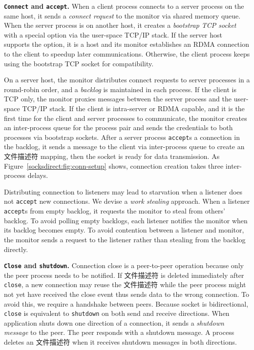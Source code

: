 \textbf{\texttt{Connect} and \texttt{accept}.}
When a client process connects to a server process on the same host, it sends a \textit{connect request} to the monitor via shared memory queue. When the server process is on another host, it creates a \textit{bootstrap TCP socket} with a special option via the user-space TCP/IP stack. If the server host supports the option, it is a \sys host and its monitor establishes an RDMA connection to the client to speedup later communications. Otherwise, the client process keeps using the bootstrap TCP socket for compatibility.

On a server host, the monitor distributes connect requests to server processes in a round-robin order, and a \textit{backlog} is maintained in each process. If the client is TCP only, the monitor proxies messages between the server process and the user-space TCP/IP stack. If the client is intra-server or RDMA capable, and it is the first time for the client and server processes to communicate, the monitor creates an inter-process queue for the process pair and sends the credentials to both processes via bootstrap sockets. After a server process \texttt{accept}s a connection in the backlog, it sends a message to the client via inter-process queue to create an 文件描述符 mapping, then the socket is ready for data transmission. As Figure~\ref{socksdirect:fig:conn-setup} shows, connection creation takes three inter-process delays.

Distributing connection to listeners may lead to starvation when a listener does not \texttt{accept} new connections. We devise a \textit{work stealing} approach. When a listener \texttt{accept}s from empty backlog, it requests the monitor to steal from others' backlog. To avoid polling empty backlogs, each listener notifies the monitor when its backlog becomes empty. To avoid contention between a listener and monitor, the monitor sends a request to the listener rather than stealing from the backlog directly.


\textbf{\texttt{Close} and \texttt{shutdown}.}
Connection close is a peer-to-peer operation because only the peer process needs to be notified. If 文件描述符 is deleted immediately after \texttt{close}, a new connection may reuse the 文件描述符 while the peer process might not yet have received the close event thus sends data to the wrong connection. To avoid this, we require a handshake between peers.
Because socket is bidirectional, \texttt{close} is equivalent to \texttt{shutdown} on both send and receive directions.
When application shuts down one direction of a connection, it sends a \textit{shutdown message} to the peer. The peer responds with a shutdown message. A process deletes an 文件描述符 when it receives shutdown messages in both directions.

